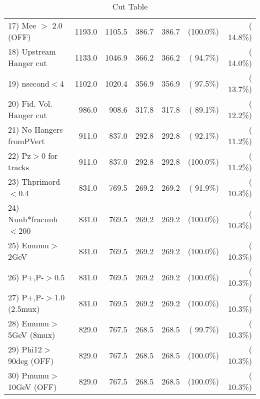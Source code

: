 \begin{table}[h!]
\begin{tabular}{||l||r|r|r|r|r|r||}
 17) Mee $>$ 2.0  (OFF)   &       1193.0 &       1105.5 &        386.7 &        386.7 & (100.0\%) & ( 14.8\%) \\
 18) Upstream Hanger cut  &       1133.0 &       1046.9 &        366.2 &        366.2 & ( 94.7\%) & ( 14.0\%) \\
 19) nsecond$<$4          &       1102.0 &       1020.4 &        356.9 &        356.9 & ( 97.5\%) & ( 13.7\%) \\
 20) Fid. Vol. Hanger cut &        986.0 &        908.6 &        317.8 &        317.8 & ( 89.1\%) & ( 12.2\%) \\
 21) No Hangers fromPVert &        911.0 &        837.0 &        292.8 &        292.8 & ( 92.1\%) & ( 11.2\%) \\
 22) Pz$>$0 for tracks    &        911.0 &        837.0 &        292.8 &        292.8 & (100.0\%) & ( 11.2\%) \\
 23) Thprimord$<$0.4      &        831.0 &        769.5 &        269.2 &        269.2 & ( 91.9\%) & ( 10.3\%) \\
 24) Nunh*fracunh$<$200   &        831.0 &        769.5 &        269.2 &        269.2 & (100.0\%) & ( 10.3\%) \\
 25) Emumu$>$2GeV         &        831.0 &        769.5 &        269.2 &        269.2 & (100.0\%) & ( 10.3\%) \\
 26) P+,P-$>$0.5          &        831.0 &        769.5 &        269.2 &        269.2 & (100.0\%) & ( 10.3\%) \\
 27) P+,P-$>$1.0 (2.5mux) &        831.0 &        769.5 &        269.2 &        269.2 & (100.0\%) & ( 10.3\%) \\
 28) Emumu$>$5GeV  (8mux) &        829.0 &        767.5 &        268.5 &        268.5 & ( 99.7\%) & ( 10.3\%) \\
 29) Phi12$>$90deg  (OFF) &        829.0 &        767.5 &        268.5 &        268.5 & (100.0\%) & ( 10.3\%) \\
 30) Pmumu$>$10GeV  (OFF) &        829.0 &        767.5 &        268.5 &        268.5 & (100.0\%) & ( 10.3\%) \\
 \hline
 \hline
 \end{tabular}
 \caption{Cut Table           }
 \label{tab-cutcohjpsi-mumu_ccdis}
 \end{table}
